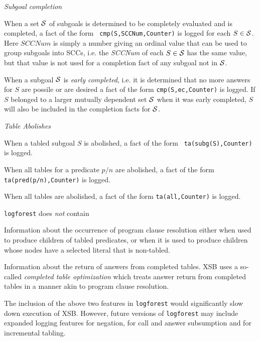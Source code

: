 \item {\em Subgoal completion}
\bi
\item When a set ${\cal S}$ of subgoals is determined to be completely
  evaluated and is completed, a fact of the form {\tt
    cmp(S,SCCNum,Counter)} is logged for each $S \in {\cal S}$.  Here
  $SCCNum$ is simply a number giving an ordinal value that can be used
  to group subgoals into SCCs, i.e. the {\em SCCNum} of each $S \in
  {\cal S}$ has the same value, but that value is not used for a completion
  fact of any subgoal not in ${\cal S}$.
%
\item When a subgoal ${\cal S}$ is {\em early completed}, i.e. it is
  determined that no more answers for $S$ are possile or are desired a
  fact of the form {\tt cmp(S,ec,Counter)} is logged.  If $S$ belonged
  to a larger mutually dependent set ${\cal S}$ when it was early
  completed, $S$ will also be included in the completion facts for
  ${\cal S}$.
\ei
\item {\em Table Abolishes}
\bi
\item When a tabled subgoal $S$ is abolished, a fact of the form {\tt
  ta(subg(S),Counter)} is logged.
\item When all tables for a predicate $p/n$ are abolished, a fact of
  the form {\tt ta(pred(p/n),Counter)} is logged.
\item When all tables are abolished, a fact of the form {\tt ta(all,Counter)} is logged.
\ei
%
\ei

{\tt logforest} does {\em not} contain

\bi
\item Information about the occurrence of program clause resolution
  either when used to produce children of tabled predicates, or when
  it is used to produce children whose nodes have a selected literal
  that is non-tabled.

\item Information about the return of answers from completed tables.
  XSB uses a so-called {\em completed table optimization} which treats
  answer return from completed tables in a manner akin to program
  clause resolution.  
 \ei

The inclusion of the above two features in {\tt logforest} would
significantly slow down execution of XSB.  However, future versions of
{\tt logforest} may include expanded logging features for negation,
for call and answer subsumption and for incremental tabling.

